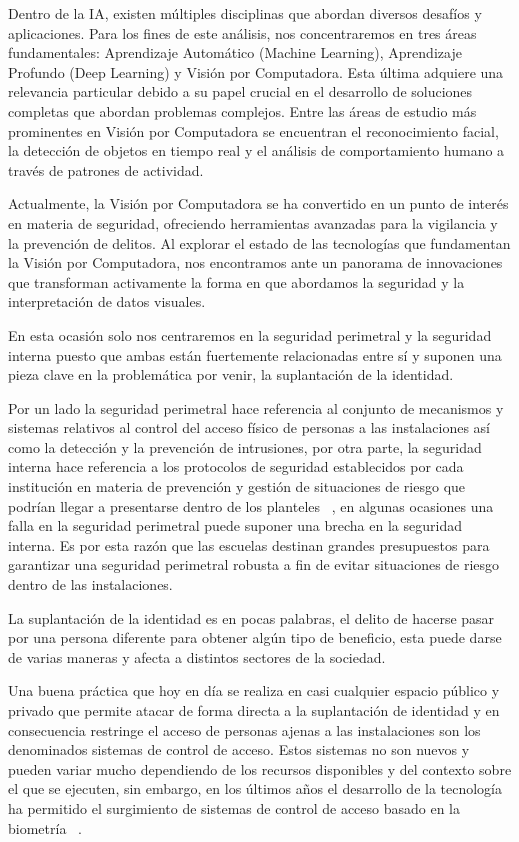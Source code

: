 Dentro de la IA, existen múltiples disciplinas que abordan diversos desafíos y aplicaciones. Para los fines de este análisis, nos concentraremos en tres áreas fundamentales: Aprendizaje Automático (Machine Learning), Aprendizaje Profundo (Deep Learning) y Visión por Computadora. Esta última adquiere una relevancia particular debido a su papel crucial en el desarrollo de soluciones completas que abordan problemas complejos. Entre las áreas de estudio más prominentes en Visión por Computadora se encuentran el reconocimiento facial, la detección de objetos en tiempo real y el análisis de comportamiento humano a través de patrones de actividad.

Actualmente, la Visión por Computadora se ha convertido en un punto de interés en materia de seguridad, ofreciendo herramientas avanzadas para la vigilancia y la prevención de delitos. Al explorar el estado de las tecnologías que fundamentan la Visión por Computadora, nos encontramos ante un panorama de innovaciones que transforman activamente la forma en que abordamos la seguridad y la interpretación de datos visuales. 


En esta ocasión solo nos centraremos en la seguridad perimetral y la seguridad interna puesto que ambas están fuertemente relacionadas entre sí y suponen una pieza clave en la problemática por venir, la suplantación de la identidad.

Por un lado la seguridad perimetral hace referencia al conjunto de mecanismos y sistemas relativos al control del acceso físico de personas a las instalaciones así como la detección y la prevención de intrusiones, por otra parte, la seguridad interna hace referencia a los protocolos de seguridad establecidos por cada institución en materia de prevención y gestión de situaciones de riesgo que podrían llegar a presentarse dentro de los planteles ~\cite{UNAMSE}, en algunas ocasiones una falla en la seguridad perimetral puede suponer una brecha en la seguridad interna. Es por esta razón que las escuelas destinan grandes presupuestos para garantizar una seguridad perimetral robusta a fin de evitar situaciones de riesgo dentro de las instalaciones.

La suplantación de la identidad es en pocas palabras, el delito de hacerse pasar por una persona diferente para obtener algún tipo de beneficio, esta puede darse de varias maneras y afecta a distintos sectores de la sociedad.


Una buena práctica que hoy en día se realiza en casi cualquier espacio público y privado que permite atacar de forma directa a la suplantación de identidad y en consecuencia restringe el acceso de personas ajenas a las instalaciones son los denominados sistemas de control de acceso. Estos sistemas no son nuevos y pueden variar mucho dependiendo de los recursos disponibles y del contexto sobre el que se ejecuten, sin embargo, en los últimos años el desarrollo de la tecnología ha permitido el surgimiento de sistemas de control de acceso basado en la biometría ~\cite{CALF}.


